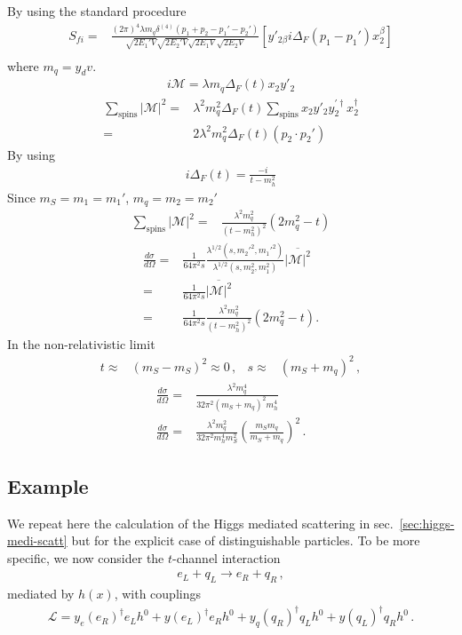 By using the standard procedure
\begin{align}
      S_{fi}
    =&\frac{(2\pi)^4 \lambda m_q \delta^{(4)}\left(p_1+p_2-p_1'-p_2'\right) }{\sqrt{2 E_1'V}\sqrt{2 E_2'V}\sqrt{2 E_1V}\sqrt{2 E_2V}}
 \left[y'_{2\beta}i\Delta_F(p_1-p_1')x_2^{\beta}\right] \nonumber\\
\end{align}
where $m_q=y_d v$.
\begin{align}
 i\mathcal{M}=\lambda  m_q\Delta_F(t) x_2y'_2 
\end{align}
\begin{align}
\sum_{\text{spins}} |\mathcal{M}|^2=&\lambda^2   m_q^2\Delta_F(t) \sum_{\text{spins}}  x_2y'_2  y^{\prime\dagger}_2x_2^{\dagger} \nonumber\\
=& 2 \lambda^2 m_q^2\Delta_F(t) \left( p_2\cdot p_2' \right) 
\end{align}
By using
\begin{align}
  i\Delta_F(t)=\frac{-i}{t-m_h^2}
\end{align}
Since $m_S=m_1=m_1'$, $m_q=m_2=m_2'$
\begin{align}
   \sum_{\text{spins}} |\mathcal{M}|^2=&\frac{\lambda^2 m_q^2}{\left( t-m_h^2 \right)^2} \left(2m_q^2-t\right)
\end{align}
\begin{align}
     \frac{d\sigma}{d\Omega}=&\frac{1}{64\pi^2s}
\frac{\lambda^{1/2}(s,{m_2'}^2,{m_1'}^2)}{\lambda^{1/2}(s,m_2^2,m_1^2)}
\overline{|\mathcal{M}|^2} \nonumber\\
=&\frac{1}{64\pi^2s}\overline{|\mathcal{M}|^2} \nonumber\\
=&\frac{1}{64\pi^2s}\frac{\lambda^2 m_q^2}{\left( t-m_h^2 \right)^2}\left(2m_q^2-t\right) .
\end{align}
In the non-relativistic limit
\begin{align}
  t\approx& (m_S-m_S)^2\approx 0\,,& 
  s\approx& (m_S+m_q)^2\,,
\end{align}
\begin{align}
   \frac{d\sigma}{d\Omega}=&
\frac{\lambda^2 m_q^4}{32\pi^2 \left(m_S+m_q\right)^2m_h^4}\nonumber\\
       \frac{d\sigma}{d\Omega}
                    =&\frac{\lambda^2m_q^2}{32\pi^2m_h^4m_S^2}\left( \frac{m_Sm_q}{m_S+m_q} \right)^2\,.
\end{align}

\subsection{Example}
We repeat here the calculation of the Higgs mediated scattering in sec.~\ref{sec:higgs-medi-scatt} but for the explicit case of distinguishable particles. To be more specific, 
we now consider the $t$-channel interaction
\begin{align}
  e_L+q_L \to e_R+q_R\,,
\end{align}
mediated by $h(x)$, with couplings
\begin{align}
\label{eq:xietaz}
\mathcal{L}= y_e \left(e_R\right)^{\dagger} e_L h^0 +y \left(e_L\right)^{\dagger} e_R h^0 
+y_q \left(q_R\right)^{\dagger} q_L h^0 +y \left(q_L\right)^{\dagger} q_R h^0 \,.
\end{align}


